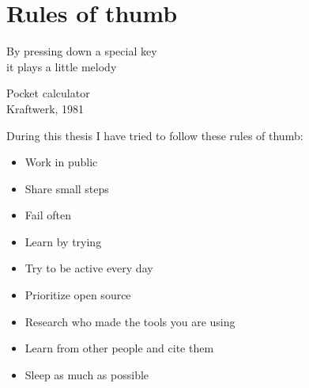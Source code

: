 \chapter{Rules of thumb}

\epigraph{By pressing down a special key \\ it plays a little melody}{Pocket calculator \\ Kraftwerk, 1981}

During this thesis I have tried to follow these rules of thumb:

\begin{itemize}
  \item Work in public
  \item Share small steps
  \item Fail often
  \item Learn by trying
  \item Try to be active every day
  \item Prioritize open source
  \item Research who made the tools you are using
  \item Learn from other people and cite them
  \item Sleep as much as possible
\end{itemize}
